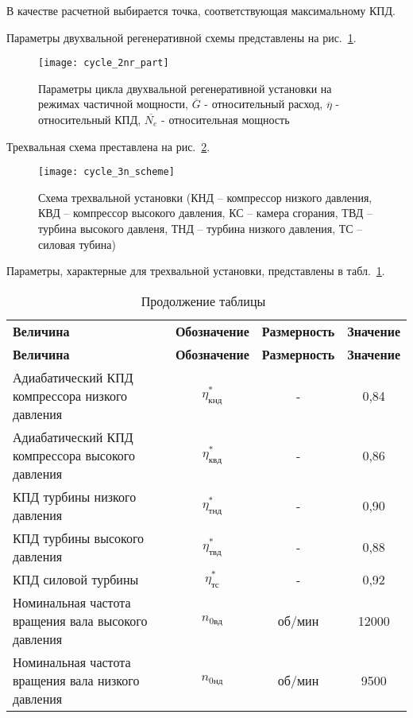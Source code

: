 В качестве расчетной выбирается точка, соответствующая максимальному КПД.

Параметры двухвальной регенеративной схемы представлены на рис.~\ref{img:cycle_2nr_part}.

\begin{figure}[H]
    \centering
    \texttt{[image: cycle\_2nr\_part]}
    \caption{Параметры цикла двухвальной регенеративной установки на режимах частичной мощности,
	$\overline{G}$ - относительный расход, $\overline{\eta}$ - относительный КПД, $\overline{N_e}$ - относительная мощность}
    \label{img:cycle_2nr_part}
\end{figure}

Трехвальная схема преставлена на рис.~\ref{img:cycle_3n_scheme}.

\begin{figure}[H]
    \centering
    \texttt{[image: cycle\_3n\_scheme]}
    \caption{Схема трехвальной установки (КНД – компрессор низкого давления, КВД – компрессор высокого давления, КС – камера сгорания, ТВД – турбина высокого давленя, ТНД – турбина низкого давления, ТС – силовая тубина)}
    \label{img:cycle_3n_scheme}
\end{figure}

Параметры, характерные для трехвальной установки, представлены в табл.~\ref{tab:cycle-3n-parameters}.

\begin{longtable}{|p{7cm}|c|c|c|}
	\caption{Параметры трехвальной схемы} 
	\label{tab:cycle-3n-parameters}
	\endfirsthead
	\caption*{\tabcapalign Продолжение таблицы~\thetable}\\[-0.45\onelineskip]
	\hline
	\textbf{Величина} & \textbf{Обозначение} & \textbf{Размерность} & \textbf{Значение} \\ \hline
	\endhead
	\hline
	\textbf{Величина} & \textbf{Обозначение} & \textbf{Размерность} & \textbf{Значение} \\ \hline
	Адиабатический КПД компрессора низкого давления & $\eta_{кнд}^*$ & - & 0,84 \\ \hline
	Адиабатический КПД компрессора высокого давления & $\eta_{квд}^*$ & - & 0,86 \\ \hline
	КПД турбины низкого давления & $\eta_{тнд}^*$ & - & 0,90 \\ \hline
	КПД турбины высокого давления & $\eta_{твд}^*$ & - & 0,88 \\ \hline
	КПД силовой турбины & $\eta_{тс}^*$ & - & 0,92 \\ \hline
	Номинальная частота вращения вала высокого давления & $n_{0вд}$ & об/мин & 12000 \\ \hline
	Номинальная частота вращения вала низкого давления & $n_{0нд}$ & об/мин & 9500 \\ \hline
\end{longtable}

